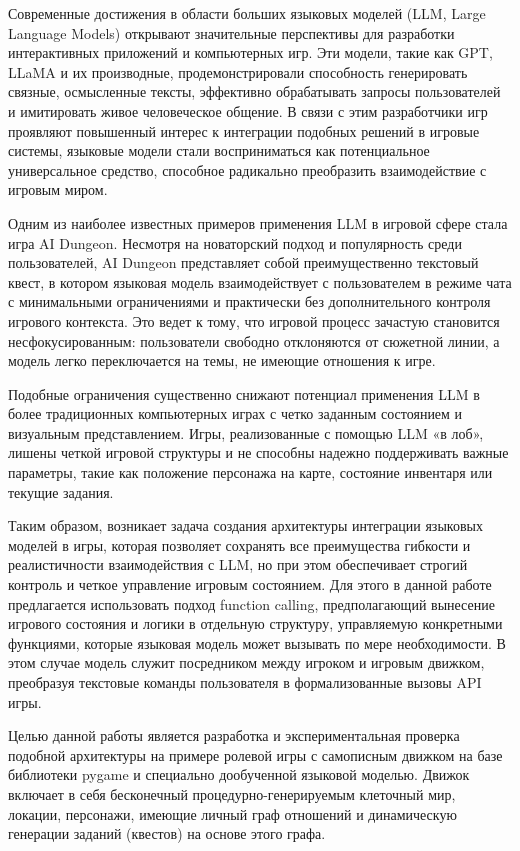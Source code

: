 \documentclass[14pt]{extarticle}
\begin{document}
Современные достижения в области больших языковых моделей (LLM, Large Language Models) открывают значительные перспективы для разработки интерактивных приложений и компьютерных игр. Эти модели, такие как GPT, LLaMA и их производные, продемонстрировали способность генерировать связные, осмысленные тексты, эффективно обрабатывать запросы пользователей и имитировать живое человеческое общение. В связи с этим разработчики игр проявляют повышенный интерес к интеграции подобных решений в игровые системы, языковые модели стали восприниматься как потенциальное универсальное средство, способное радикально преобразить взаимодействие с игровым миром.

Одним из наиболее известных примеров применения LLM в игровой сфере стала игра AI Dungeon. Несмотря на новаторский подход и популярность среди пользователей, AI Dungeon представляет собой преимущественно текстовый квест, в котором языковая модель взаимодействует с пользователем в режиме чата с минимальными ограничениями и практически без дополнительного контроля игрового контекста. Это ведет к тому, что игровой процесс зачастую становится несфокусированным: пользователи свободно отклоняются от сюжетной линии, а модель легко переключается на темы, не имеющие отношения к игре.

Подобные ограничения существенно снижают потенциал применения LLM в более традиционных компьютерных играх с четко заданным состоянием и визуальным представлением. Игры, реализованные с помощью LLM «в лоб», лишены четкой игровой структуры и не способны надежно поддерживать важные параметры, такие как положение персонажа на карте, состояние инвентаря или текущие задания.

Таким образом, возникает задача создания архитектуры интеграции языковых моделей в игры, которая позволяет сохранять все преимущества гибкости и реалистичности взаимодействия с LLM, но при этом обеспечивает строгий контроль и четкое управление игровым состоянием. Для этого в данной работе предлагается использовать подход function calling, предполагающий вынесение игрового состояния и логики в отдельную структуру, управляемую конкретными функциями, которые языковая модель может вызывать по мере необходимости. В этом случае модель служит посредником между игроком и игровым движком, преобразуя текстовые команды пользователя в формализованные вызовы API игры.

Целью данной работы является разработка и экспериментальная проверка подобной архитектуры на примере ролевой игры с самописным движком на базе библиотеки pygame и специально дообученной языковой моделью. Движок включает в себя бесконечный процедурно-генерируемым клеточный мир, локации, персонажи, имеющие личный граф отношений и динамическую генерации заданий (квестов) на основе этого графа.
\end{document}
